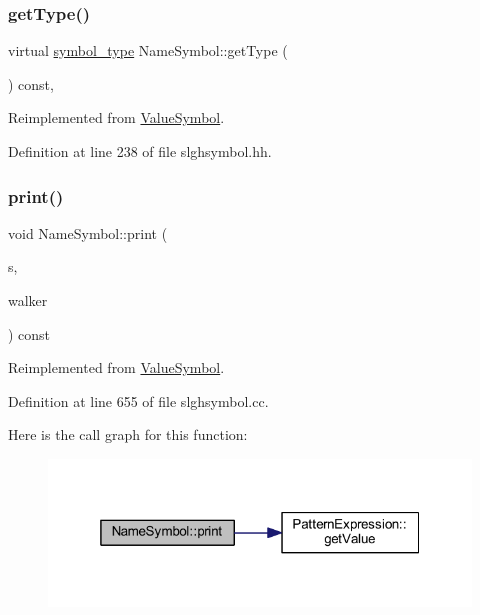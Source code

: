 \subsubsection{\texorpdfstring{getType()}{getType()}}
{\footnotesize\ttfamily virtual \mbox{\hyperlink{class_sleigh_symbol_aba70f7f332fd63488c5ec4bd7807db41}{symbol\+\_\+type}} Name\+Symbol\+::get\+Type (\begin{DoxyParamCaption}\item[{void}]{ }\end{DoxyParamCaption}) const\hspace{0.3cm}{\ttfamily [inline]}, {\ttfamily [virtual]}}



Reimplemented from \mbox{\hyperlink{class_value_symbol_aa134aca647315ca414f6e4e4a246c9ae}{Value\+Symbol}}.



Definition at line 238 of file slghsymbol.\+hh.

\mbox{\label{class_name_symbol_a611940036621c526ec59691bc8a749bb}} 
\subsubsection{\texorpdfstring{print()}{print()}}
{\footnotesize\ttfamily void Name\+Symbol\+::print (\begin{DoxyParamCaption}\item[{ostream \&}]{s,  }\item[{\mbox{\hyperlink{class_parser_walker}{Parser\+Walker}} \&}]{walker }\end{DoxyParamCaption}) const\hspace{0.3cm}{\ttfamily [virtual]}}



Reimplemented from \mbox{\hyperlink{class_value_symbol_a82b3d3fbfc6d3ed118103f12220cdfd4}{Value\+Symbol}}.



Definition at line 655 of file slghsymbol.\+cc.

Here is the call graph for this function\+:
\nopagebreak
\begin{figure}[H]
\begin{center}
\leavevmode
\includegraphics[width=319pt]{class_name_symbol_a611940036621c526ec59691bc8a749bb_cgraph}
\end{center}
\end{figure}
\mbox{\label{class_name_symbol_aad6d2abf3eaaeb6c92bc2a2b7f4c0a4c}} 
